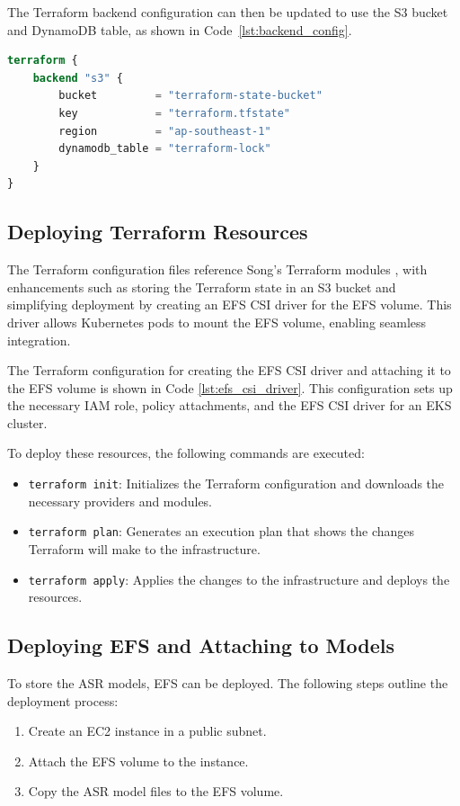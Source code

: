 The Terraform backend configuration can then be updated to use the S3 bucket and DynamoDB table, as shown in Code~\ref{lst:backend_config}.

\begin{lstlisting}[language=Terraform, caption={Terraform Backend Configuration}, label={lst:backend_config}]
terraform {
    backend "s3" {
        bucket         = "terraform-state-bucket"
        key            = "terraform.tfstate"
        region         = "ap-southeast-1"
        dynamodb_table = "terraform-lock"
    }
}
\end{lstlisting}

\subsection{Deploying Terraform Resources}
The Terraform configuration files reference Song's Terraform modules \cite{song_yu}, with enhancements such as storing the Terraform state in an S3 bucket and simplifying deployment by creating an EFS CSI driver for the EFS volume. This driver allows Kubernetes pods to mount the EFS volume, enabling seamless integration.

The Terraform configuration for creating the EFS CSI driver and attaching it to the EFS volume is shown in Code \ref{lst:efs_csi_driver}. This configuration sets up the necessary IAM role, policy attachments, and the EFS CSI driver for an EKS cluster.

To deploy these resources, the following commands are executed:
\begin{itemize}
    \item \texttt{terraform init}: Initializes the Terraform configuration and downloads the necessary providers and modules.
    \item \texttt{terraform plan}: Generates an execution plan that shows the changes Terraform will make to the infrastructure.
    \item \texttt{terraform apply}: Applies the changes to the infrastructure and deploys the resources.
\end{itemize}

\subsection{Deploying EFS and Attaching to Models}
To store the ASR models, EFS can be deployed. The following steps outline the deployment process:
\begin{enumerate}
    \item Create an EC2 instance in a public subnet.
    \item Attach the EFS volume to the instance.
    \item Copy the ASR model files to the EFS volume.
\end{enumerate}


